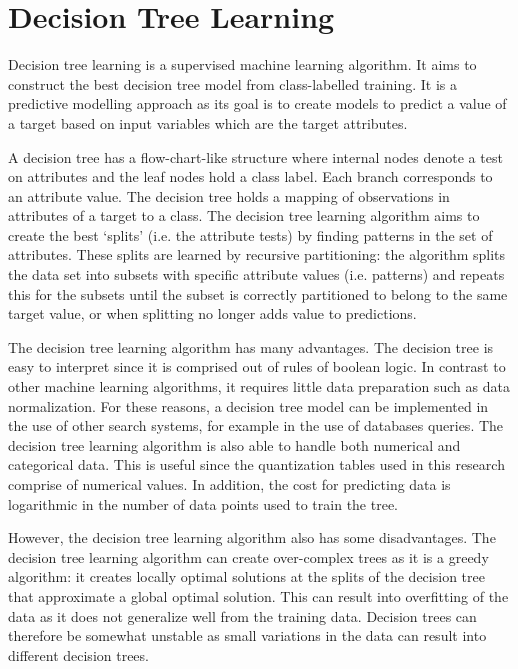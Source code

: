 \section{Decision Tree Learning}

Decision tree learning is a supervised machine learning algorithm. It aims to construct the best decision tree model from class-labelled training. It is a predictive modelling approach as its goal is to create models to predict a value of a target based on input variables which are the target attributes.

A decision tree has a flow-chart-like structure where internal nodes denote a test on attributes and the leaf nodes hold a class label. Each branch corresponds to an attribute value. The decision tree holds a mapping of observations in attributes of a target to a class. The decision tree learning algorithm aims to create the best `splits' (i.e. the attribute tests) by finding patterns in the set of attributes. These splits are learned by recursive partitioning: the algorithm splits the data set into subsets with specific attribute values (i.e. patterns) and repeats this for the subsets until the subset is correctly partitioned to belong to the same target value, or when splitting no longer adds value to predictions.

The decision tree learning algorithm has many advantages. The decision tree is easy to interpret since it is comprised out of rules of boolean logic. In contrast to other machine learning algorithms, it requires little data preparation such as data normalization. For these reasons, a decision tree model can be implemented in the use of other search systems, for example in the use of databases queries. The decision tree learning algorithm is also able to handle both numerical and categorical data. This is useful since the quantization tables used in this research comprise of numerical values. In addition, the cost for predicting data is logarithmic in the number of data points used to train the tree. 

However, the decision tree learning algorithm also has some disadvantages. The decision tree learning algorithm can create over-complex trees as it is a greedy algorithm: it creates locally optimal solutions at the splits of the decision tree that approximate a global optimal solution. This can result into overfitting of the data as it does not generalize well from the training data. Decision trees can therefore be somewhat unstable as small variations in the data can result into different decision trees. 

